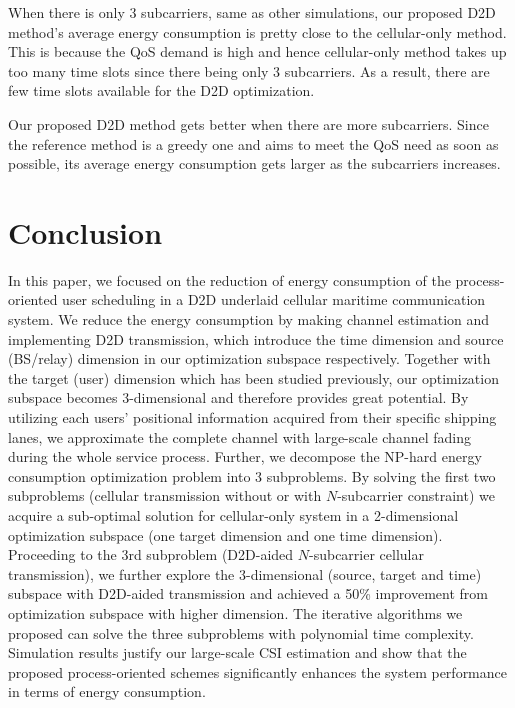 \documentclass{ieeeaccess}
\begin{document}
When there is only 3 subcarriers, same as other simulations, our proposed D2D method's average energy consumption is pretty close to the cellular-only method. This is because the QoS demand is high and hence cellular-only method takes up too many time slots since there being only 3 subcarriers. As a result, there are few time slots available for the D2D optimization.

Our proposed D2D method gets better when there are more subcarriers. Since the reference method is a greedy one and aims to meet the QoS need as soon as possible, its average energy consumption gets larger as the subcarriers increases.

\section{Conclusion}\label{sec:4}

In this paper, we focused on the reduction of energy consumption of the process-oriented user scheduling in a D2D underlaid cellular maritime communication system. 
We reduce the energy consumption by making channel estimation and implementing D2D transmission, which introduce the time dimension and source (BS/relay) dimension in our optimization subspace respectively. Together with the target (user) dimension which has been studied previously, our optimization subspace becomes 3-dimensional and therefore provides great potential. 
By utilizing each users' positional information acquired from their specific shipping lanes, we approximate the complete channel with large-scale channel fading during the whole service process. Further, we decompose the NP-hard energy consumption optimization problem into 3 subproblems. By solving the first two subproblems (cellular transmission without or with $N$-subcarrier constraint) we acquire a sub-optimal solution for cellular-only system in a 2-dimensional optimization subspace (one target dimension and one time dimension). Proceeding to the 3rd subproblem (D2D-aided $N$-subcarrier cellular transmission), we further explore the 3-dimensional (source, target and time) subspace with D2D-aided transmission and achieved a 50\% improvement from optimization subspace with higher dimension. The iterative algorithms we proposed can solve the three subproblems with polynomial time complexity. Simulation results justify our large-scale CSI estimation and show that the proposed process-oriented schemes significantly enhances the system performance in terms of energy consumption.


\appendices
\end{document}
